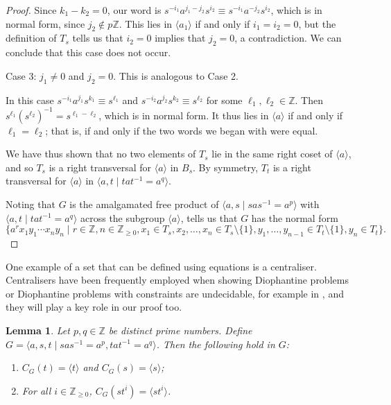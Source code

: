 \documentclass[11pt]{amsart}
\newtheorem{lem}[theorem]{Lemma}
\theoremstyle{definition}
\numberwithin{theorem}{section}
\newcommand{\Z}{\mathbb{Z}}
\begin{document}
\begin{proof}
		Since \(k_1 - k_2 = 0\), our word is \(s^{-i_1} a^{j_1 - j_2}
		s^{i_2} \equiv s^{-i_1} a^{-j_2} s^{i_2}\), which is in normal
		form, since \(j_2 \notin p\Z\). This lies in \(\langle a_1
		\rangle\) if and only if \(i_1 = i_2 = 0\), but the definition
		of \(T_s\) tells us that \(i_2 = 0\) implies that \(j_2 = 0\),
		a contradiction. We can conclude that this case does not occur.

		Case 3: \(j_1 \neq 0\) and \(j_2 = 0\). This is analogous to
		Case 2.

		In this case \(s^{-i_1} a^{j_1} s^{k_1} \equiv s^{\ell_1}\)
		and \(s^{-i_2} a^{j_2} s^{k_2} \equiv s^{\ell_2}\) for some
		\(\ell_1, \ell_2 \in \Z\). Then
		\(s^{\ell_1} (s^{\ell_2})^{-1} = s^{\ell_1 - \ell_2}\),
		which is in normal form. It thus lies in \(\langle a \rangle\)
		if and only if \(\ell_1 = \ell_2\); that is, if and only if
		the two words we began with were equal.

		We have thus shown that no two elements of \(T_s\) lie in
		the same right coset of \(\langle a \rangle\), and so
		\(T_s\) is a right transversal for \(\langle a \rangle\)
		in \(B_s\).
		By symmetry, \(T_t\) is a right transversal for
		\(\langle a \rangle\) in \(\langle a, t \mid tat^{-1} = a^q\rangle\).

		Noting that \(G\) is the amalgamated free product of
		\(\langle a, s \mid sas^{-1} = a^p \rangle\) with \(\langle a, t
		\mid tat^{-1} = a^q \rangle\) across the subgroup \(\langle a\rangle\),
		\cite[Theorem 11.3]{BogopolskiBook} tells us that \(G\) has the normal form	
\[
\{a^r x_1 y_1 \cdots x_n y_n \mid r \in \Z, n \in \Z_{\geq 0},
					x_1 \in T_s, x_2, \ldots, x_n \in T_s \setminus \{1\}, 
			y_1, \ldots, y_{n - 1} \in T_t \setminus \{1\}, y_n \in T_t \}.
\]
\end{proof}

One example of a set that can be defined using equations is a centraliser.
	Centralisers have been frequently employed when showing Diophantine
	problems or Diophantine problems with constraints are undecidable, for
	example in \cite{BuchiSenger, CiobanuGarreta, duchin_liang_shapiro, ElliottLevine,  random_nilpotent_eqns, KharlampovichMiasnikov2025}, and they will play a key role in our proof too. 

\begin{lem}
		\label{GBS-cents}
		Let \(p, q \in \mathbb{Z}\) be distinct prime numbers. Define 
		\(G = \langle a, s, t \mid sas^{-1} = a^p, tat^{-1} = a^q \rangle\).
		Then the following hold in \(G\):
		\begin{enumerate}
			\item \(C_G(t) = \langle t \rangle\) and \(C_G(s) = \langle s \rangle\);
					\label{GBS-cent-s-t}
			\item For all \(i \in \Z_{\geq 0}\), \(C_G(st^i) = \langle st^i \rangle\).
					\label{GBS-cent-sti}
		\end{enumerate}
	\end{lem}
\end{document}
